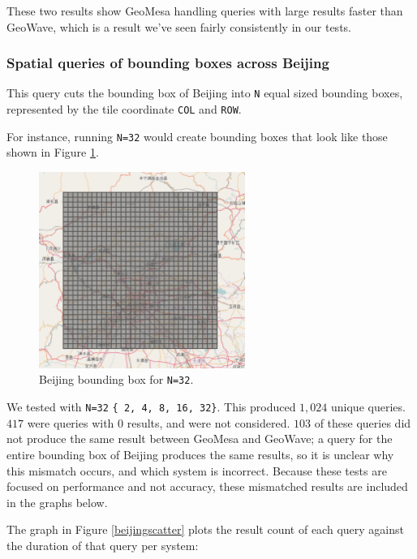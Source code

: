 These two results show GeoMesa handling queries with large results faster than GeoWave, which is a result we've seen fairly consistently in our tests.

\subsubsection{Spatial queries of bounding boxes across Beijing}

This query cuts the bounding box of Beijing into \texttt{N} equal sized bounding boxes,
represented by the tile coordinate \texttt{COL} and \texttt{ROW}.

For instance, running \texttt{N=32} would create bounding boxes that look like those shown in Figure \ref{beijingbbox32}.

\begin{figure}[h!tb]
  \centering
  \includegraphics[width=0.60\textwidth]{../docs/img/beijing-bbox-32.png}
  \caption{Beijing bounding box for \texttt{N=32}.}
  \label{beijingbbox32}
\end{figure}

We tested with \texttt{N=32} \texttt{\{ 2, 4, 8, 16, 32\}}. This produced $1,024$ unique queries.
$417$ were queries with $0$ results, and were not considered.
$103$ of these queries did not produce the same result between GeoMesa and GeoWave;
a query for the entire bounding box of Beijing produces the same results,
so it is unclear why this mismatch occurs, and which system is incorrect.
Because these tests are focused on performance and not accuracy, these mismatched results are included in the graphs below.

The graph in Figure \ref{beijingscatter} plots the result count of each query against the duration of that query per system:

